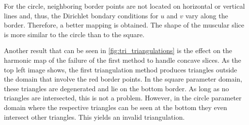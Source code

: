 For the circle, neighboring border points are not located on horizontal or vertical lines and, thus, the Dirichlet bondary conditions for $u$ and $v$ vary along the border. Therefore, a better mapping is obtained. The shape of the muscular slice is more similar to the circle than to the square.

Another result that can be seen in \cref{fig:tri_triangulations} is the effect on the harmonic map of the failure of the first method to handle concave slices. As the top left image shows, the first triangulation method produces triangles outside the domain that involve the red border points. In the square parameter domain, these triangles are degenerated and lie on the bottom border. As long as no triangles are intersected, this is not a problem. However, in the circle parameter domain where the respective triangles can be seen at the bottom they even intersect other triangles. This yields an invalid triangulation.

